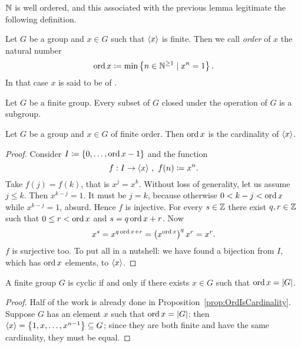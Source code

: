 \(\mathbb N\) is well ordered, and this associated with the previous lemma legitimate the following definition.

\begin{definition}
Let \(G\) be a group and \(x \in G\) such that \(\left\langle x\right\rangle\) is finite. Then we call {\em order} of \(x\) the natural number
\[\operatorname{ord} x \coloneq \min \left\{n \in \mathbb N^{\ge 1} \mid x^n = 1\right\}.\]
In that case \(x\) is said to be of .
\end{definition}

\begin{exercise}
Let \(G\) be a finite group. Every subset of \(G\) closed under the operation of \(G\) is a subgroup.
\end{exercise}

\begin{proposition}\label{prop:OrdIsCardinality}
Let \(G\) be a group and \(x \in G\) of finite order. Then \(\operatorname{ord} x\) is the cardinality of \(\left\langle x\right\rangle\).
\end{proposition}

\begin{proof}
Consider \(I \coloneq \left\{0, \dots{}, \operatorname{ord} x-1\right\}\) and the function
\[f : I \to \left\langle x\right\rangle\,, \ f(n) \coloneq x^n.\]
Take \(f(j) = f(k)\), that is \(x^j = x^k\). Without loss of generality, let us assume \(j \le k\). Then \(x^{k-j} = 1\). It must be \(j = k\), because otherwise \(0 < k-j < \operatorname{ord} x\) while \(x^{k-j} = 1\), absurd. Hence \(f\) is injective.\newline
For every \(s \in \mathbb Z\) there exist \(q, r \in \mathbb Z\) such that \(0 \le r < \operatorname{ord} x\) and \(s = q \operatorname{ord} x +r\). Now
\[x^s = x^{q \operatorname{ord} x +r} = \left(x^{\operatorname{ord} x}\right)^q x^r = x^r.\]
\(f\) is surjective too.\newline
To put all in a nutshell: we have found a bijection from \(I\), which has \(\operatorname{ord} x\) elements, to \(\left\langle x\right\rangle\).
\end{proof}

\begin{proposition}\label{prop:CyclicIffOrdIsCard}
A finite group \(G\) is cyclic if and only if there exists \(x \in G\) such that \(\operatorname{ord} x = \lvert G \rvert\).
\end{proposition}

\begin{proof}
Half of the work is already done in Proposition~\ref{prop:OrdIsCardinality}. Suppose \(G\) has an element \(x\) such that \(\operatorname{ord} x = \lvert G \rvert\): then \(\left\langle x\right\rangle = \left\{1, x, \dots{}, x^{n-1}\right\} \subseteq G\); since they are both finite and have the same cardinality, they must be equal.
\end{proof}


